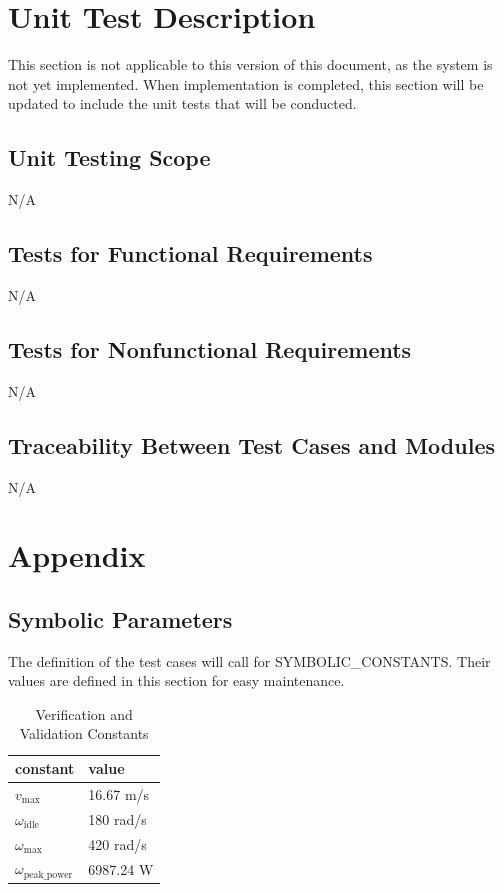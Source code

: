 \documentclass[12pt, titlepage]{article}
\begin{document}
\section{Unit Test Description}

This section is not applicable to this version of this document, as the system is not yet implemented.
When implementation is completed, this section will be updated to include the unit tests that will be conducted.

\subsection{Unit Testing Scope}
N/A

\subsection{Tests for Functional Requirements}
N/A

\subsection{Tests for Nonfunctional Requirements}
N/A

\subsection{Traceability Between Test Cases and Modules}
N/A	





\newpage

\section{Appendix}

\subsection{Symbolic Parameters}

The definition of the test cases will call for SYMBOLIC\_CONSTANTS.
Their values are defined in this section for easy maintenance.

\begin{table}[h]
  \raggedright
  \begin{tabular}{l l} 
    \toprule		
    \textbf{constant} & \textbf{value}\\
    \midrule
    $v_\text{max}$ & 16.67 m/s \\
    $\omega_{\text{idle}}$ & 180 rad/s \\
    $\omega_\text{max}$ & 420 rad/s \\
    $\omega_\text{peak\_power}$ & 6987.24 W \\
    \bottomrule
  \end{tabular}
  \caption{Verification and Validation Constants}
  \label{tab:vnv_constants}
\end{table}
\end{document}
